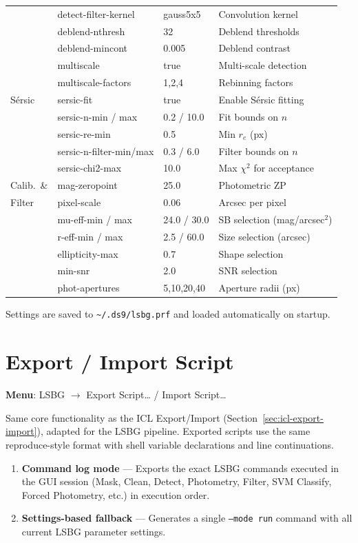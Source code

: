 \documentclass[11pt,fleqn]{book}
\begin{document}
\begin{center}
\begin{longtable}{L{2.5cm} L{4cm} L{2cm} L{4cm}}
 & detect-filter-kernel & gauss5x5 & Convolution kernel \\
 & deblend-nthresh & 32 & Deblend thresholds \\
 & deblend-mincont & 0.005 & Deblend contrast \\
 & multiscale & true & Multi-scale detection \\
 & multiscale-factors & 1,2,4 & Rebinning factors \\
\midrule
S\'ersic & sersic-fit & true & Enable S\'ersic fitting \\
 & sersic-n-min / max & 0.2 / 10.0 & Fit bounds on $n$ \\
 & sersic-re-min & 0.5 & Min $r_e$ (px) \\
 & sersic-n-filter-min/max & 0.3 / 6.0 & Filter bounds on $n$ \\
 & sersic-chi2-max & 10.0 & Max $\chi^2$ for acceptance \\
\midrule
Calib.\ \& & mag-zeropoint & 25.0 & Photometric ZP \\
Filter & pixel-scale & 0.06 & Arcsec per pixel \\
 & mu-eff-min / max & 24.0 / 30.0 & SB selection (mag/arcsec$^2$) \\
 & r-eff-min / max & 2.5 / 60.0 & Size selection (arcsec) \\
 & ellipticity-max & 0.7 & Shape selection \\
 & min-snr & 2.0 & SNR selection \\
 & phot-apertures & 5,10,20,40 & Aperture radii (px) \\
\bottomrule
\end{longtable}
\end{center}

Settings are saved to \texttt{\textasciitilde/.ds9/lsbg.prf} and loaded automatically on startup.


\section{Export / Import Script}
\label{sec:lsbg-export-import}

\textbf{Menu}: LSBG $\to$ Export Script\ldots{} / Import Script\ldots

Same core functionality as the ICL Export/Import (Section~\ref{sec:icl-export-import}), adapted for the LSBG pipeline.  Exported scripts use the same reproduce-style format with shell variable declarations and line continuations.

\begin{enumerate}
  \item \textbf{Command log mode} --- Exports the exact LSBG commands executed in the GUI session (Mask, Clean, Detect, Photometry, Filter, SVM Classify, Forced Photometry, etc.) in execution order.
  \item \textbf{Settings-based fallback} --- Generates a single \texttt{--mode run} command with all current LSBG parameter settings.
\end{enumerate}
\end{document}
